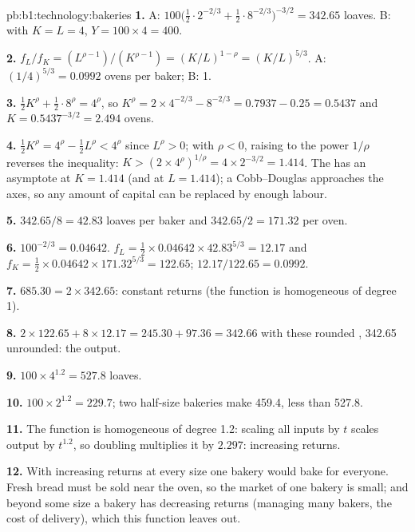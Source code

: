 \begin{solution}{pb:b1:technology:bakeries}
\textbf{1.} A: $100\bigl(\tfrac12 \cdot 2^{-2/3} + \tfrac12 \cdot 8^{-2/3}\bigr)^{-3/2} = 342.65$ loaves.
B: with $K = L = 4$, $Y = 100 \times 4 = 400$.

\textbf{2.} $f_L/f_K = (L^{\rho-1})/(K^{\rho-1}) = (K/L)^{1-\rho} = (K/L)^{5/3}$. A:
$(1/4)^{5/3} = 0.0992$ ovens per baker; B: 1.

\textbf{3.} $\tfrac12K^\rho + \tfrac12 \cdot 8^\rho = 4^\rho$, so $K^\rho = 2 \times 4^{-2/3} - 8^{-2/3} = 0.7937 - 0.25 = 0.5437$
and $K = 0.5437^{-3/2} = 2.494$ ovens.

\textbf{4.} $\tfrac12K^\rho = 4^\rho - \tfrac12L^\rho < 4^\rho$ since $L^\rho > 0$; with $\rho < 0$, raising
to the power $1/\rho$ reverses the inequality: $K > (2 \times 4^\rho)^{1/\rho} = 4 \times 2^{-3/2} = 1.414$.
The  has an asymptote at $K = 1.414$ (and at $L = 1.414$); a
Cobb--Douglas  approaches the axes, so any amount of capital can be
replaced by enough labour.

\textbf{5.} $342.65/8 = 42.83$ loaves per baker and $342.65/2 = 171.32$ per oven.

\textbf{6.} $100^{-2/3} = 0.04642$. $f_L = \tfrac12 \times 0.04642 \times 42.83^{5/3} = 12.17$ and
$f_K = \tfrac12 \times 0.04642 \times 171.32^{5/3} = 122.65$; $12.17/122.65 = 0.0992$.

\textbf{7.} $685.30 = 2 \times 342.65$: constant returns (the function is
homogeneous of degree 1).

\textbf{8.} $2 \times 122.65 + 8 \times 12.17 = 245.30 + 97.36 = 342.66$ with these
rounded , 342.65 unrounded: the output.

\textbf{9.} $100 \times 4^{1.2} = 527.8$ loaves.

\textbf{10.} $100 \times 2^{1.2} = 229.7$; two half-size bakeries make 459.4, less than
527.8.

\textbf{11.} The function is homogeneous of degree 1.2: scaling all inputs by
$t$ scales output by $t^{1.2}$, so doubling multiplies it by $2.297$:
increasing returns.

\textbf{12.} With increasing returns at every size one bakery would bake for
everyone. Fresh bread must be sold near the oven, so the market of one
bakery is small; and beyond some size a bakery has decreasing returns
(managing many bakers, the cost of delivery), which this function leaves
out.


\end{solution}
